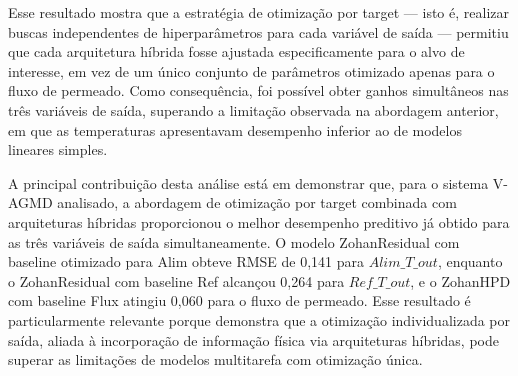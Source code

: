 Esse resultado mostra que a estratégia de otimização por target — isto é, realizar buscas independentes de hiperparâmetros para cada variável de saída — permitiu que cada arquitetura híbrida fosse ajustada especificamente para o alvo de interesse, em vez de um único conjunto de parâmetros otimizado apenas para o fluxo de permeado. Como consequência, foi possível obter ganhos simultâneos nas três variáveis de saída, superando a limitação observada na abordagem anterior, em que as temperaturas apresentavam desempenho inferior ao de modelos lineares simples.

A principal contribuição desta análise está em demonstrar que, para o sistema V-AGMD analisado, a abordagem de otimização por target combinada com arquiteturas híbridas proporcionou o melhor desempenho preditivo já obtido para as três variáveis de saída simultaneamente. O modelo ZohanResidual com baseline otimizado para Alim obteve RMSE de 0,141 para $Alim\_T\_out$, enquanto o ZohanResidual com baseline Ref alcançou 0,264 para $Ref\_T\_out$, e o ZohanHPD com baseline Flux atingiu 0,060 para o fluxo de permeado. Esse resultado é particularmente relevante porque demonstra que a otimização individualizada por saída, aliada à incorporação de informação física via arquiteturas híbridas, pode superar as limitações de modelos multitarefa com otimização única.